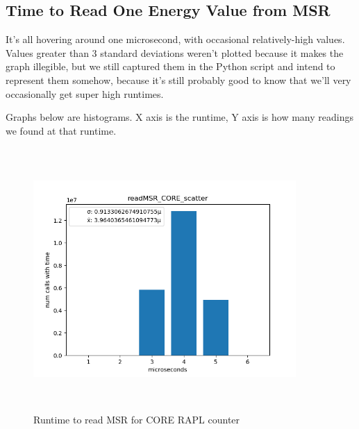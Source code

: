 \subsection{Time to Read One Energy Value from MSR}
    It's all hovering around one microsecond, with occasional relatively-high values. Values greater than 3 standard deviations weren't plotted because it makes the graph illegible, but we still captured them
    in the Python script and intend to represent them somehow, because it's still probably good to know
    that we'll very occasionally get super high runtimes.
    
    Graphs below are histograms. X axis is the runtime, Y axis is how many readings we found at that runtime.
    
    \begin{figure}[H]
	    \centering
	    \includegraphics[width=10cm,height=10cm,keepaspectratio]{jmh/readmsr-runtime/readMSR_CORE_scatter.png}
	    \caption{Runtime to read MSR for CORE RAPL counter}
	    \label{fig:CORE-rapl-counter}
    \end{figure}
    
